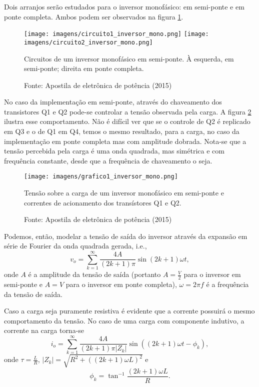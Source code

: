 Dois arranjos serão estudados para o inversor monofásico: em semi-ponte e em ponte completa. Ambos podem ser observados na figura \ref{c1im}.

\begin{figure}[h]
\center
\texttt{[image: imagens/circuito1\_inversor\_mono.png]}
\texttt{[image: imagens/circuito2\_inversor\_mono.png]}
\caption{Circuitos de um inversor monofásico em semi-ponte. À esquerda, em semi-ponte;  direita em ponte completa.}\label{c1im} 
\caption*{Fonte: Apostila de eletrônica de potência (2015)}
\end{figure}

No caso da implementação em semi-ponte, através do chaveamento dos transistores Q1 e Q2 pode-se controlar a tensão observada pela carga. A figura \ref{g1im} ilustra esse comportamento. Não é difícil ver que se o controle de Q2 é replicado em Q3 e o de Q1 em Q4, temos o mesmo resultado, para a carga, no caso da implementação em ponte completa mas com amplitude dobrada. Nota-se que a tensão percebida pela carga é uma onda quadrada, mas simétrica e com frequência constante, desde que a frequência de chaveamento o seja.

\begin{figure}[h]
\center
\texttt{[image: imagens/grafico1\_inversor\_mono.png]}
\caption{Tensão sobre a carga de um inversor monofásico em semi-ponte e correntes de acionamento dos transístores Q1 e Q2.}\label{g1im} 
\caption*{Fonte: Apostila de eletrônica de potência (2015)}
\end{figure}

Podemos, então, modelar a tensão de saída do inversor através da expansão em série de Fourier da onda quadrada gerada, i.e., \[
    v_{o} = \sum_{k=1}^{\infty}\frac{4A}{\left( 2k +1 \right) \pi}\sin{\left( 2k+1 \right) \omega{t}} 
,\] onde $A$ é a amplitude da tensão de saída (portanto $A = \frac{V}{2}$ para o inversor em semi-ponte e $A = V$ para o inversor em ponte completa), $\omega = 2\pi f$ é a frequência da tensão de saída.

Caso a carga seja puramente resistiva é evidente que a corrente possuirá o mesmo comportamento da tensão. No caso de uma carga com componente indutivo, a corrente na carga torna-se \[
    i_{o} = \sum_{k=1}^{\infty}\frac{4A}{\left( 2k+1 \right) \pi{|Z_{k}|}}\sin(\left( 2k+1 \right)\omega{t} - \phi_{k})
,\] onde $\tau = \frac{L}{R}$, $|Z_k| = \sqrt{R^{2} + (\left( 2k+1 \right) \omega{L})^2}$ e \[
\phi_{k} = \tan^{-1} \frac{\left( 2k+1 \right) \omega{L}}{R}
.\] 

